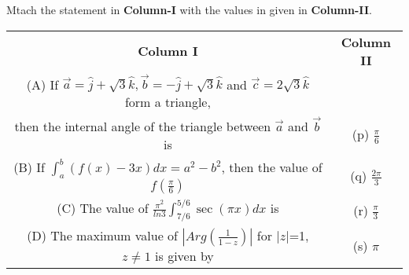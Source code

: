 \clearpage
\item Mtach the statement in \textbf{Column-I} with the values in given in \textbf{Column-II}.
\begin{table}[ht!]
\centering
\begin{tabular}{c c} 
 \textbf{Column I} & \textbf{Column II}\\ [0.5ex] 
 (A) If $\overrightarrow{a}=\hat{j}+\sqrt{3}\hat{k}, \overrightarrow{b}
     =-\hat{j}+\sqrt{3}\hat{k}$ and $\overrightarrow{c}=2\sqrt{3}\hat{k}$
     form a triangle,\\ then the internal angle of the triangle between
     $\overrightarrow{a}$ and $\overrightarrow{b}$ is                             &(p) $\frac{\pi}{6}$\\ 
 (B) If $\int_{a}^{b}(f(x)-3x)dx=a^2-b^2$, then the value of $f(\frac{\pi}{6})$   &(q) $\frac{2\pi}{3}$\\
 (C) The value of $\frac{\pi^{2}}{ln3}\int_{7/6}^{5/6}\sec(\pi x)dx$ is           &(r) $\frac{\pi}{3}$\\
 (D) The maximum value of $|Arg(\frac{1}{1-z})|$ for $|z|$=1, 
     $z \neq 1$ is given by                                                       &(s) $\pi$\\[1ex] 

\end{tabular}
\end{table}

